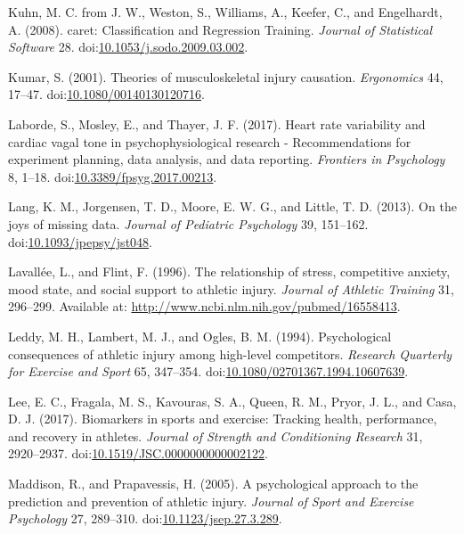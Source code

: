 \documentclass[
  english,
  man]{apa6}
\newlength{\cslhangindent}
\newenvironment{cslreferences}%
  {\setlength{\parindent}{0pt}%
  \everypar{\setlength{\hangindent}{\cslhangindent}}\ignorespaces}%
  {\par}
\begin{document}
\begin{cslreferences}
\leavevmode\hypertarget{ref-Kuhn2008}{}%
Kuhn, M. C. from J. W., Weston, S., Williams, A., Keefer, C., and Engelhardt, A. (2008). caret: Classification and Regression Training. \emph{Journal of Statistical Software} 28. doi:\href{https://doi.org/10.1053/j.sodo.2009.03.002}{10.1053/j.sodo.2009.03.002}.

\leavevmode\hypertarget{ref-Kumar2001}{}%
Kumar, S. (2001). Theories of musculoskeletal injury causation. \emph{Ergonomics} 44, 17--47. doi:\href{https://doi.org/10.1080/00140130120716}{10.1080/00140130120716}.

\leavevmode\hypertarget{ref-Laborde2017}{}%
Laborde, S., Mosley, E., and Thayer, J. F. (2017). Heart rate variability and cardiac vagal tone in psychophysiological research - Recommendations for experiment planning, data analysis, and data reporting. \emph{Frontiers in Psychology} 8, 1--18. doi:\href{https://doi.org/10.3389/fpsyg.2017.00213}{10.3389/fpsyg.2017.00213}.

\leavevmode\hypertarget{ref-Lang2014}{}%
Lang, K. M., Jorgensen, T. D., Moore, E. W. G., and Little, T. D. (2013). On the joys of missing data. \emph{Journal of Pediatric Psychology} 39, 151--162. doi:\href{https://doi.org/10.1093/jpepsy/jst048}{10.1093/jpepsy/jst048}.

\leavevmode\hypertarget{ref-Lavallee1996}{}%
Lavallée, L., and Flint, F. (1996). The relationship of stress, competitive anxiety, mood state, and social support to athletic injury. \emph{Journal of Athletic Training} 31, 296--299. Available at: \url{http://www.ncbi.nlm.nih.gov/pubmed/16558413}.

\leavevmode\hypertarget{ref-Leddy1994}{}%
Leddy, M. H., Lambert, M. J., and Ogles, B. M. (1994). Psychological consequences of athletic injury among high-level competitors. \emph{Research Quarterly for Exercise and Sport} 65, 347--354. doi:\href{https://doi.org/10.1080/02701367.1994.10607639}{10.1080/02701367.1994.10607639}.

\leavevmode\hypertarget{ref-Lee2017}{}%
Lee, E. C., Fragala, M. S., Kavouras, S. A., Queen, R. M., Pryor, J. L., and Casa, D. J. (2017). Biomarkers in sports and exercise: Tracking health, performance, and recovery in athletes. \emph{Journal of Strength and Conditioning Research} 31, 2920--2937. doi:\href{https://doi.org/10.1519/JSC.0000000000002122}{10.1519/JSC.0000000000002122}.

\leavevmode\hypertarget{ref-Maddison2005}{}%
Maddison, R., and Prapavessis, H. (2005). A psychological approach to the prediction and prevention of athletic injury. \emph{Journal of Sport and Exercise Psychology} 27, 289--310. doi:\href{https://doi.org/10.1123/jsep.27.3.289}{10.1123/jsep.27.3.289}.


\end{cslreferences}
\end{document}
